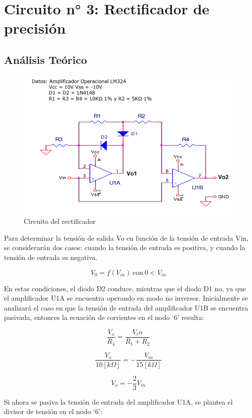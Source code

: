\section{Circuito n° 3: Rectificador de precisión }

\subsection{Análisis Teórico}

\begin{figure}[H]
    \centering
    \includegraphics[width=0.5\linewidth]{Secciones/Circuito3/circuito.png}
    \caption{Circuito del rectificador}
    \label{fig:Circuito3}
\end{figure}

Para determinar la tensión de salida Vo en función de la tensión de entrada Vin, se considerarán dos casos: cuando la tensión de entrada es positiva, y cuando la tensión de entrada es negativa.

\[V_0 = f(V_{in}) \ \text{con} \ 0 < V_{in}\]

En estas condiciones, el diodo D2 conduce, mientras que el diodo D1 no, ya que el amplificador U1A se encuentra operando en modo no inversor.
Inicialmente se analizará el caso en que la tensión de entrada del amplificador U1B se encuentra pasivada, entonces la ecuación de corrientes en el nodo ‘6’ resulta:

\begin{equation}
\frac{V_o}{R_4} = \frac{V_in}{R_1 + R_2}
\end{equation}

\begin{equation}
\frac{V_o}{10[k\Omega]} = -\frac{V_{in}}{15[k\Omega]}
\end{equation}

\begin{equation}
V_o = - \frac{2}{3}V_{in}
\end{equation}

Si ahora se pasiva la tensión de entrada del amplificador U1A, se plantea el divisor de tensión en el nodo ‘6’:


